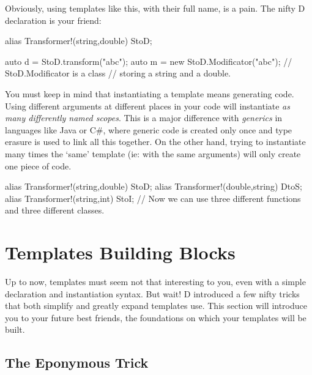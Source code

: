 Obviously, using templates like this, with their full name, is a pain. The nifty D  declaration is your friend:

\begin{dcode}
alias Transformer!(string,double) StoD;

auto d = StoD.transform("abc");
auto m = new StoD.Modificator("abc"); // StoD.Modificator is a class
                                      // storing a string and a double.
\end{dcode}

You must keep in mind that instantiating a template means generating code. Using different arguments at different places in your code will instantiate \emph{as many differently named scopes}. This is a major difference with \emph{generics} in languages like Java or C\#, where generic code is created only once and type erasure is used to link all this together. On the other hand, trying to instantiate many times the `same' template (ie: with the same arguments) will only create one piece of code.

\begin{dcode}
alias Transformer!(string,double) StoD;
alias Transformer!(double,string) DtoS;
alias Transformer!(string,int)    StoI;
// Now we can use three different functions and three different classes.
\end{dcode}


\section{Templates Building Blocks}\label{buildingblocks}

Up to now, templates must seem not that interesting to you, even with a simple declaration and instantiation syntax. But wait! D introduced a few nifty tricks that both simplify and greatly expand templates use. This section will introduce you to your future best friends, the foundations on which your templates will be built.

\subsection{The Eponymous Trick}\label{eponymous}


